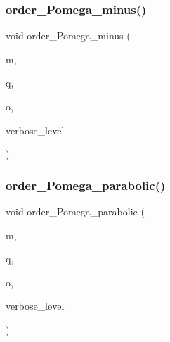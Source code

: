 \mbox{\label{_l_i_b_2_g_a_l_o_i_s_2orthogonal__points_8_c_a8d4f57d774f93b76346247838640198d}} 
\subsubsection{\texorpdfstring{order\+\_\+\+Pomega\+\_\+minus()}{order\_Pomega\_minus()}}
{\footnotesize\ttfamily void order\+\_\+\+Pomega\+\_\+minus (\begin{DoxyParamCaption}\item[{\mbox{\hyperlink{galois_8h_a09fddde158a3a20bd2dcadb609de11dc}{I\+NT}}}]{m,  }\item[{\mbox{\hyperlink{galois_8h_a09fddde158a3a20bd2dcadb609de11dc}{I\+NT}}}]{q,  }\item[{\mbox{\hyperlink{classlonginteger__object}{longinteger\+\_\+object}} \&}]{o,  }\item[{\mbox{\hyperlink{galois_8h_a09fddde158a3a20bd2dcadb609de11dc}{I\+NT}}}]{verbose\+\_\+level }\end{DoxyParamCaption})}

\mbox{\label{_l_i_b_2_g_a_l_o_i_s_2orthogonal__points_8_c_ac63f711f1b5ae8a8d12f21150be953ef}} 
\subsubsection{\texorpdfstring{order\+\_\+\+Pomega\+\_\+parabolic()}{order\_Pomega\_parabolic()}}
{\footnotesize\ttfamily void order\+\_\+\+Pomega\+\_\+parabolic (\begin{DoxyParamCaption}\item[{\mbox{\hyperlink{galois_8h_a09fddde158a3a20bd2dcadb609de11dc}{I\+NT}}}]{m,  }\item[{\mbox{\hyperlink{galois_8h_a09fddde158a3a20bd2dcadb609de11dc}{I\+NT}}}]{q,  }\item[{\mbox{\hyperlink{classlonginteger__object}{longinteger\+\_\+object}} \&}]{o,  }\item[{\mbox{\hyperlink{galois_8h_a09fddde158a3a20bd2dcadb609de11dc}{I\+NT}}}]{verbose\+\_\+level }\end{DoxyParamCaption})}

